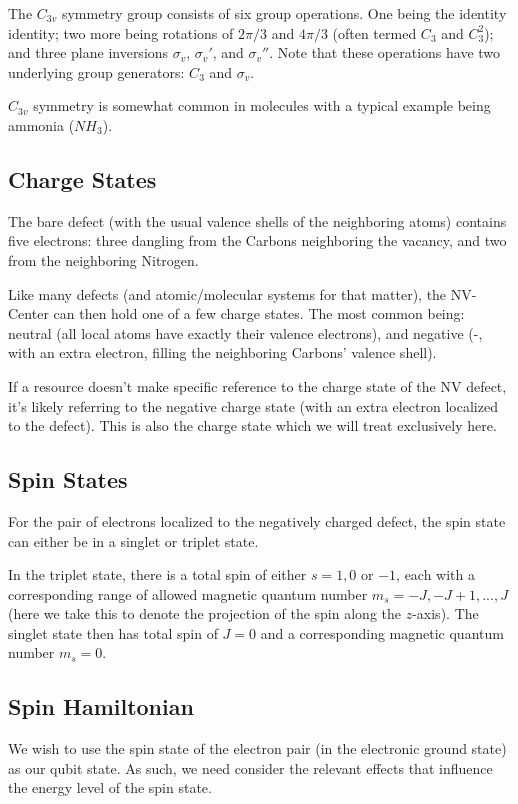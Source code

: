 \documentclass[10pt,a4paper]{article}
\begin{document}
\begin{multicols}{2}
The $C_{3v}$ symmetry group consists of six group operations. One being the identity identity; two more being rotations of $2\pi/3$ and $4\pi/3$ (often termed $C_3$ and $C_3^2$); and three plane inversions $\sigma_v$, $\sigma_v'$, and $\sigma_v''$. 
Note that these operations have two underlying group generators: $C_3$ and $\sigma_v$. 

$C_{3v}$ symmetry is somewhat common in molecules with a typical example being ammonia ($NH_3$).

\subsection{Charge States}
The bare defect (with the usual valence shells of the neighboring atoms) contains five electrons: three  dangling from the Carbons neighboring the vacancy, and two from the neighboring Nitrogen.

Like many defects (and atomic/molecular systems for that matter), the NV-Center can then hold one of a few charge states. The most common being: neutral (all local atoms have exactly their valence electrons), and negative (-, with an extra electron, filling the neighboring Carbons' valence shell).

If a resource doesn't make specific reference to the charge state of the NV defect, it's likely referring to the negative charge state (with an extra electron localized to the defect). This is also the charge state which we will treat exclusively here.

\subsection{Spin States}
For the pair of electrons localized to the negatively charged defect, the spin state can either be in a singlet or triplet state. 

In the triplet state, there is a total spin of either $s=1,0$ or $-1$, each with a corresponding range of allowed magnetic quantum number $m_s=-J,-J+1,...,J$ (here we take this to denote the projection of the spin along the $z$-axis).
The singlet state then has total spin of $J=0$ and a corresponding magnetic quantum number $m_s=0$.

\subsection{Spin Hamiltonian}
We wish to use the spin state of the electron pair (in the electronic ground state) as our qubit state. As such, we need consider the relevant effects that influence the energy level of the spin state.


\end{multicols}
\end{document}
